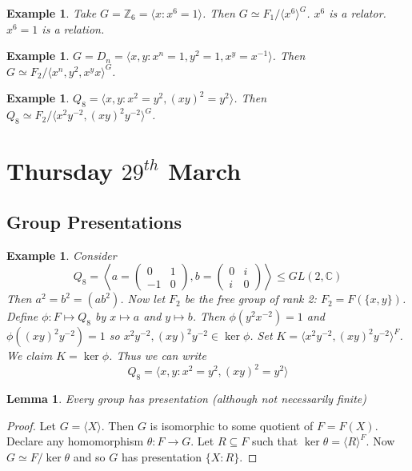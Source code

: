 \documentclass[a4paper,10pt]{article}
\newcommand{\CC}{\mathbb{C}}
\newcommand{\ZZ}{\mathbb{Z}}
\newtheorem{eg}[thm]{Example}
\newtheorem{Lem}[thm]{Lemma}
\begin{document}
\begin{eg}
Take $G = \ZZ_6 = \langle x : x^6 = 1\rangle$. Then $G \simeq F_1 / \langle x^6 \rangle^G$. $x^6$ is a relator. $x^6 = 1$ is a relation.
\end{eg}

\begin{eg}
$G = D_n = \langle x,y : x^n = 1, y^2 = 1, x^y = x^{-1} \rangle$. Then $G \simeq F_2 / \langle x^n, y^2, x^y x \rangle^G$.
\end{eg}

\begin{eg}
$Q_8 = \langle x,y : x^2 = y^2, (xy)^2 = y^2 \rangle$. Then $Q_8 \simeq F_2 / \langle x^2y^{-2}, (xy)^2y^{-2} \rangle^G$. 
\end{eg}





\newpage
\section{Thursday $29^{th}$ March}

\subsection{Group Presentations}
\begin{eg}
Consider 
\[ Q_8 = \left\langle a = \begin{pmatrix} 0 & 1 \\ -1 & 0 \end{pmatrix}, b = \begin{pmatrix} 0 & i \\ i & 0 \end{pmatrix} \right\rangle \leq GL(2,\CC) \]
Then $a^2 = b^2 = (ab^2)$. Now let $F_2$ be the free group of rank 2: $F_2 = F(\{ x, y\})$. Define $\phi: F \mapsto Q_8$ by $x \mapsto a$ and $y \mapsto b$. Then $\phi( y^2x^{-2}) = 1$ and $\phi( (xy)^2y^{-2}) = 1$ so $x^2y^{-2}, (xy)^2y^{-2} \in \ker \phi$. Set $K = \langle x^2y^{-2}, (xy)^2y^{-2} \rangle^F$. We claim $K = \ker \phi$. Thus we can write 
\[ Q_8 = \langle x,y : x^2 = y^2, (xy)^2 = y^2 \rangle \]
\end{eg}

\begin{Lem}
Every group has presentation (although not necessarily finite) 
\end{Lem}

\begin{proof}
Let $G = \langle X \rangle$. Then $G$ is isomorphic to some quotient of $F = F(X)$. Declare any homomorphism $\theta : F \rightarrow G$. Let $R \subseteq F$ such that $\ker \theta = \langle R \rangle^F$. Now $G \simeq F / \ker \theta$ and so $G$ has presentation $\{ X : R \}$. 
\end{proof}
\end{document}
